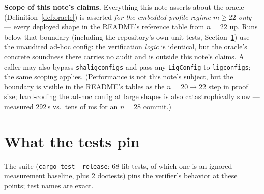 \documentclass[11pt]{article}
\newcommand{\code}[1]{{\def\_{\textunderscore\allowbreak}\texttt{#1}}}
\begin{document}
\textbf{Scope of this note's claims.}  Everything this note asserts about
the oracle (Definition~\ref{def:oracle}) is asserted \emph{for the
embedded-profile regime $m \ge 22$ only} — every deployed shape in the
README's reference table from $n = 22$ up.  Runs below that boundary
(including the repository's own unit tests, Section~\ref{sec:tests}) use
the unaudited ad-hoc config: the verification \emph{logic} is identical,
but the oracle's concrete soundness there carries no audit and is outside
this note's claims.  A caller may also bypass \code{sha\_lig\_configs}
and pass any \code{LigConfig} to \code{lig\_configs}; the same scoping
applies.  (Performance is not this note's subject, but the boundary is
visible in the README's tables as the $n = 20 \to 22$ step in proof size;
hard-coding the ad-hoc config at large shapes is also catastrophically
slow — measured 292\,s vs.\ tens of ms for an $n=28$ commit.)

\section{What the tests pin}
\label{sec:tests}

The suite (\code{cargo test --release}: 68 lib tests, of which one is an
ignored measurement baseline, plus 2 doctests) pins the verifier's
behavior at these points; test names are exact.
\end{document}
